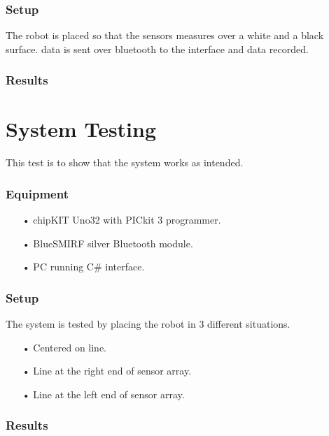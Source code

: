 \subsubsection{Setup}
The robot is placed so that the sensors measures over a white and a black surface.
data is sent over bluetooth to the interface and data recorded.

\subsubsection{Results}

\section{System Testing}
This test is to show that the system works as intended.

\subsubsection{Equipment}
\begin{enumerate}
	\item[•]chipKIT Uno32 with PICkit 3 programmer.
	\item[•]BlueSMIRF silver Bluetooth module.
	\item[•]PC running C\# interface.
\end{enumerate}

\subsubsection{Setup}
The system is tested by placing the robot in 3 different situations.
\begin{enumerate}
	\item[•]Centered on line.
	\item[•]Line at the right end of sensor array.
	\item[•]Line at the left end of sensor array.
\end{enumerate}
\newpage
\subsubsection{Results}
\newpage
